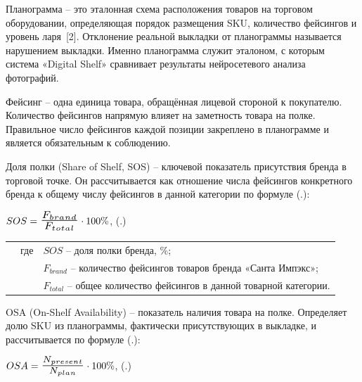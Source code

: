 {  \par \redline Планограмма {--} это эталонная схема расположения товаров на торговом
  оборудовании, определяющая порядок размещения SKU, количество фейсингов
  и уровень ларя~[2].
  Отклонение реальной выкладки от планограммы называется нарушением выкладки.
  Именно планограмма служит эталоном, с которым система «Digital Shelf»
  сравнивает результаты нейросетевого анализа фотографий.

  \par \redline Фейсинг {--} одна единица товара, обращённая лицевой стороной к покупателю.
  Количество фейсингов напрямую влияет на заметность товара на полке.
  Правильное число фейсингов каждой позиции закреплено в планограмме и является
  обязательным к соблюдению.

  \par \redline Доля полки (Share of Shelf, SOS) {--} ключевой показатель присутствия бренда
  в торговой точке. Он рассчитывается как отношение числа фейсингов конкретного
  бренда к общему числу фейсингов в данной категории по формуле
  (\thechaptercntr .\theformulacntr):

  \formulaspace
  \par \redline $SOS = \scaleto{\frac{F_{brand}}{F_{total}}}{20pt} \cdot 100\%$,
  \hfill (\thechaptercntr .\theformulacntr) \hspace*{-0.5cm}\redline
  \formulaspace \addtocounter{formulacntr}{1}

  \begin{tabular}{p{}p{}p{}}
    & где  & $SOS$ {--} доля полки бренда, \%; \\
    &      & $F_{brand}$ {--} количество фейсингов товаров бренда «Санта Импэкс»; \\
    &      & $F_{total}$ {--} общее количество фейсингов в данной товарной категории. \\
  \end{tabular}
  \vspace{13pt}
  
  \par \redline OSA (On-Shelf Availability) {--} показатель наличия товара на полке.
  Определяет долю SKU из планограммы, фактически присутствующих в выкладке,
  и рассчитывается по формуле (\thechaptercntr .\theformulacntr):

  \formulaspace
  \par \redline $OSA = \scaleto{\frac{N_{present}}{N_{plan}}}{20pt} \cdot 100\%$,
  \hfill (\thechaptercntr .\theformulacntr) \hspace*{-0.5cm}\redline
  \formulaspace \addtocounter{formulacntr}{1}

}
